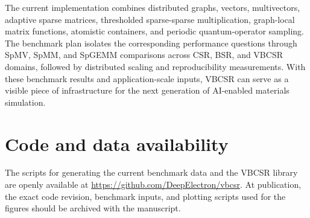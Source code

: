 \documentclass[
reprint,
superscriptaddress,
frontmatterverbose,
amsmath,amssymb,
pra,
]{revtex4-2}
\begin{document}
The current implementation combines distributed graphs, vectors, multivectors,
adaptive sparse matrices, thresholded sparse-sparse multiplication, graph-local
matrix functions, atomistic containers, and periodic quantum-operator sampling.
The benchmark plan isolates the corresponding performance questions through
SpMV, SpMM, and SpGEMM comparisons across CSR, BSR, and VBCSR domains, followed
by distributed scaling and reproducibility measurements.  With these benchmark
results and application-scale inputs, VBCSR can serve as a visible piece of
infrastructure for the next generation of AI-enabled materials simulation.

\section*{Code and data availability}

The scripts for generating the current benchmark data and the VBCSR library are
openly available at \url{https://github.com/DeepElectron/vbcsr}.  At
publication, the exact code revision, benchmark inputs, and plotting scripts
used for the figures should be archived with the manuscript.

\appendix


\end{document}
